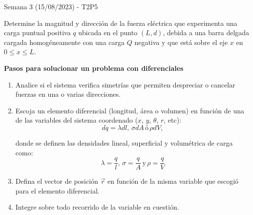 \begin{frame}{Semana 3 (15/08/2023) - T2P5}
    
    Determine la magnitud y direcci\'on de la fuerza el\'ectrica que experimenta una carga puntual positiva $q$ ubicada en el punto $(L,d)$, debida a una barra delgada cargada homogéneamente con una carga $Q$ negativa y que est\'a sobre el eje $x$ en $0\leq x\leq L$.
    
\end{frame}

\begin{frame}{}

    \textbf{Pasos para solucionar un problema con diferenciales}

    \begin{enumerate}
        \item Analice si el sistema verifica simetrías que permiten despreciar o cancelar fuerzas en una o varias direcciones. 
        \item Escoja un elemento diferencial (longitud, área o volumen) en función de una de las variables del sistema coordenado ($x$, $y$, $\theta$, $r$, etc):
        \begin{equation*}
            dq = \lambda dl,\, \sigma dA\, \text{ó}\, \rho dV,
        \end{equation*}

        donde se definen las densidades lineal, superficial y volumétrica de carga como:
        \begin{equation*}
            \lambda = \frac{q}{l},\, \sigma = \frac{q}{A}\, \text{y}\, \rho = \frac{q}{V}
        \end{equation*}
        \item Defina el vector de posición $\vec{r}$ en función de la misma variable que escogió para el elemento diferencial.
        \item Integre sobre todo recorrido de la variable en cuestión.
    \end{enumerate}
    
\end{frame}

